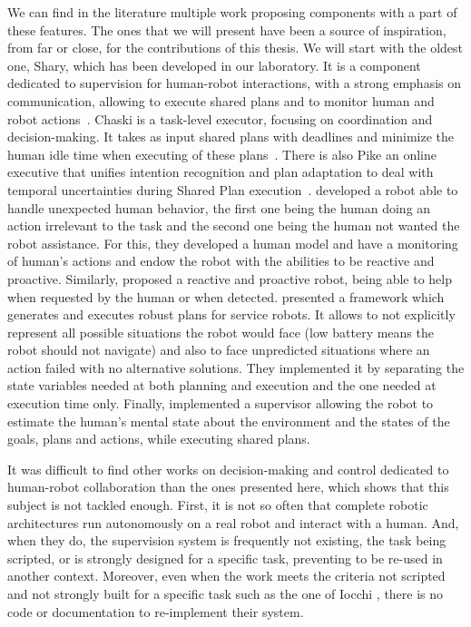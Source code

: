 \documentclass[a4paper,11pt,twoside]{StyleThese}
\begin{document}
We can find in the literature multiple work proposing components with a part of these features. The ones that we will present have been a source of inspiration, from far or close, for the contributions of this thesis. We will start with the oldest one, Shary, which has been developed in our laboratory. It is a component dedicated to supervision for human-robot interactions, with a strong emphasis on communication, allowing to execute shared plans and to monitor human and robot actions~\citep{clodic_2009_shary}. Chaski is a task-level executor, focusing on coordination and decision-making. It takes as input shared plans with deadlines and minimize the human idle time when executing of these plans~\citep{shah_2011_improved}. There is also Pike an online executive that unifies intention recognition and plan adaptation to deal with temporal uncertainties during Shared Plan execution~\citep{karpas_2015_robust}. \cite{gorur_2017_toward, gorur_2018_social} developed a robot able to handle unexpected human behavior, the first one being the human doing an action irrelevant to the task and the second one being the human not wanted the robot assistance. For this, they developed a human model and have a monitoring of human's actions and endow the robot with the abilities to be reactive and proactive. Similarly, \cite{baraglia_2017_efficient} proposed a reactive and proactive robot, being able to help when requested by the human or when detected. \cite{iocchi_2016_practical} presented a framework which generates and executes robust plans for service robots. It allows to not explicitly represent all possible situations the robot would face (\eg low battery means the robot should not navigate) and also to face unpredicted situations where an action failed with no alternative solutions. They implemented it by separating the state variables needed at both planning and execution and the one needed at execution time only. Finally, \cite{devin_2016_implemented} implemented a supervisor allowing the robot to estimate the human's mental state about the environment and the states of the goals, plans and actions, while executing shared plans.

\bigskip

It was difficult to find other works on decision-making and control dedicated to human-robot collaboration than the ones presented here, which shows that this subject is not tackled enough. First, it is not so often that complete robotic architectures run autonomously on a real robot and interact with a human. And, when they do, the supervision system is frequently not existing, the task being scripted, or is strongly designed for a specific task, preventing to be re-used in another context. Moreover, even when the work meets the criteria not scripted and not strongly built for a specific task such as the one of Iocchi \etal{}, there is no code or documentation to re-implement their system.
\end{document}
